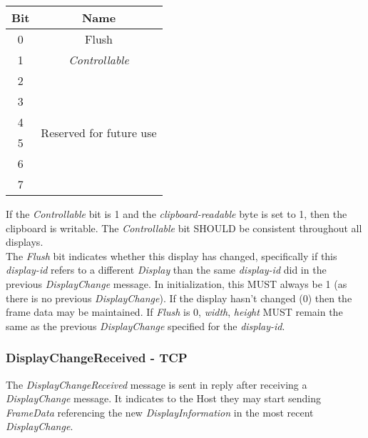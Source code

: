 \documentclass{article}
\begin{document}
    \begin{center}
        \begin{tabular}{|c|c|}
            \hline
            \textbf{Bit} & \textbf{Name}                               \\
            \hline
            0            & Flush                                       \\
            \hline
            1            & \emph{Controllable}                         \\
            \hline
            2            & \multirow{6}{10em}{Reserved for future use} \\
            3            &                                             \\
            4            &                                             \\
            5            &                                             \\
            6            &                                             \\
            7            &                                             \\
            \hline
        \end{tabular}
    \end{center}

    If the \emph{Controllable} bit is 1 and the \emph{clipboard-readable} byte is set to 1, then the clipboard is
    writable. The \emph{Controllable} bit SHOULD be consistent throughout all displays.\\

    The \emph{Flush} bit indicates whether this display has changed, specifically if this \emph{display-id} refers to
    a different \emph{Display} than the same \emph{display-id} did in the previous \emph{DisplayChange} message. In
    initialization, this MUST always be 1 (as there is no previous \emph{DisplayChange}). If the display hasn't
    changed (0) then the frame data may be maintained. If \emph{Flush} is 0, \emph{width}, \emph{height} MUST remain
    the same as the previous \emph{DisplayChange} specified for the \emph{display-id}.

    \subsubsection{DisplayChangeReceived - TCP}

    The \emph{DisplayChangeReceived} message is sent in reply after receiving a \emph{DisplayChange} message. It
    indicates to the Host they may start sending \emph{FrameData} referencing the new \emph{DisplayInformation} in
    the most recent \emph{DisplayChange}.
\end{document}

